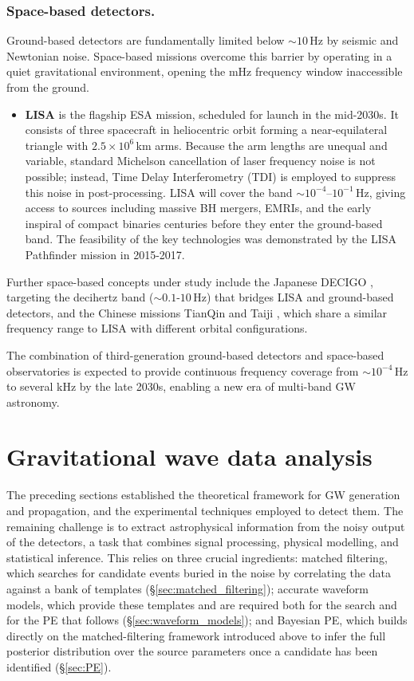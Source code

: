 \subsubsection{Space-based detectors.}
\label{spacebased_detectors}
Ground-based detectors are fundamentally limited below $\sim\!10$\,Hz by seismic and Newtonian noise. Space-based missions overcome this barrier by operating in a quiet gravitational environment, opening the mHz frequency window inaccessible from the ground.

\begin{itemize}
    \item \textbf{LISA} \cite{LISA_detector} is the flagship ESA mission, scheduled for launch in the mid-2030s. It consists of three spacecraft in heliocentric orbit forming a near-equilateral triangle with $2.5\times10^6$\,km arms. Because the arm lengths are unequal and variable, standard Michelson cancellation of laser frequency noise is not possible; instead, Time Delay Interferometry (TDI) is employed to suppress this noise in post-processing. LISA will cover the band $\sim\!10^{-4}$--$10^{-1}$\,Hz, giving access to sources including massive BH mergers, EMRIs, and the early inspiral of compact binaries centuries before they enter the ground-based band. The feasibility of the key technologies was demonstrated by the LISA Pathfinder mission in 2015-2017.
\end{itemize}

Further space-based concepts under study include the Japanese 
DECIGO \cite{DECIGO_detector}, targeting the decihertz band ($\sim\!0.1$-$10$\,Hz) that bridges LISA and ground-based detectors, and the Chinese missions TianQin and Taiji \cite{TianQin_detector}, which share a similar frequency range to LISA with different orbital configurations.

The combination of third-generation ground-based detectors and space-based observatories is expected to provide continuous frequency coverage from $\sim\!10^{-4}$\,Hz to several kHz by the late 2030s, enabling a new era of multi-band GW astronomy.


\section{Gravitational wave data analysis}
\label{sec:data_analysis}

The preceding sections established the theoretical framework for GW generation and propagation, and the experimental techniques employed to detect them. The remaining challenge is to extract astrophysical information from the noisy output of the detectors, a task that combines signal processing, physical modelling, and statistical inference. This relies on three crucial ingredients: matched filtering, which searches for candidate events buried in the noise by correlating the data against a bank of templates (\S\ref{sec:matched_filtering}); accurate waveform models, which provide these templates and are required both for the search and for the PE that follows (\S\ref{sec:waveform_models}); and Bayesian PE, which builds directly on the matched-filtering framework introduced above to infer the full posterior distribution over the source parameters once a candidate has been identified (\S\ref{sec:PE}).

